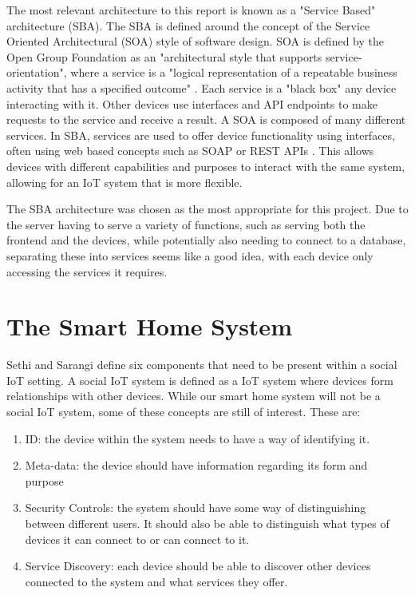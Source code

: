 The most relevant architecture to this report is known as a "Service Based" architecture (SBA). The SBA is defined around the concept of the Service Oriented Architectural (SOA) style \cite{InteractingSoaBasedIot} of software design. SOA is defined by the Open Group Foundation as an "architectural style that supports service-orientation", where a service is a "logical representation of a repeatable business activity that has a specified outcome" \cite{SoaSourceBook}. Each service is a "black box" any device interacting with it. Other devices use interfaces and API endpoints to make requests to the service and receive a result. A SOA is composed of many different services. In SBA, services are used to offer device functionality using interfaces, often using web based concepts such as SOAP or REST APIs \cite{TrustManagementSoaIot}. This allows devices with different capabilities and purposes to interact with the same system, allowing for an IoT system that is more flexible. 

The SBA architecture was chosen as the most appropriate for this project. Due to the server having to serve a variety of functions, such as serving both the frontend and the devices, while potentially also needing to connect to a database, separating these into services seems like a good idea, with each device only accessing the services it requires.


\section{The Smart Home System} \label{sec:chap2:smarthome}
Sethi and Sarangi \cite{IoTArchitectures} define six components that need to be present within a social IoT setting. A social IoT system is defined as a IoT system where devices form relationships with other devices. While our smart home system will not be a social IoT system, some of these concepts are still of interest. These are: 
\begin{enumerate}
    \item ID: the device within the system needs to have a way of identifying 
        it.
    \item Meta-data: the device should have information regarding its form and 
        purpose
    \item Security Controls: the system should have some way of distinguishing 
        between different users. It should also be able to distinguish what 
        types of devices it can connect to or can connect to it.
    \item Service Discovery: each device should be able to discover other 
        devices connected to the system and what services they offer.
\end{enumerate}

